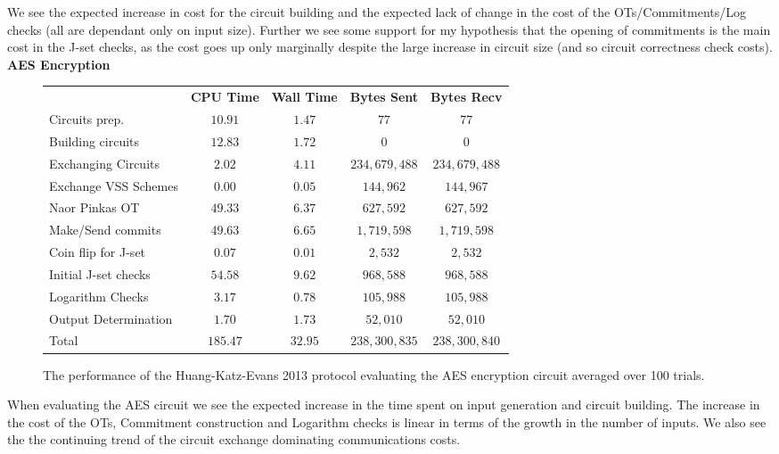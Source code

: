 \documentclass[ %
                    author={Nicholas Tutte},
                supervisor={Prof. Nigel Smart},
                    degree={MEng},
                     title={Secure Two Party Computation},
                  subtitle={A practical comparison of recent protocols},
                      type={Research - GG1K},
                      year={2015} ]{dissertation}
\begin{document}
				We see the expected increase in cost for the circuit building and the expected lack of change in the cost of the OTs/Commitments/Log checks (all are dependant only on input size). Further we see some support for my hypothesis that the opening of commitments is the main cost in the J-set checks, as the cost goes up only marginally despite the large increase in circuit size (and so circuit correctness check costs).\\

				\FloatBarrier
				\noindent \textbf{AES Encryption}
				\begin{figure}[!ht]
					\begin{tabular}{| p{4.3cm} | c c c c |}
						\hline
						& \textbf{CPU Time} & \textbf{Wall Time} & \textbf{Bytes Sent} & \textbf{Bytes Recv} \\
						\thickhline
						Circuits prep. & $10.91$ & $1.47$ & $77$ & $77$ \\
						\hline
						Building circuits & $12.83$ & $1.72$ & $0$ & $0$ \\
						\hline
						Exchanging Circuits & $2.02$ & $4.11$ & $234,679,488$ & $234,679,488$ \\
						\hline
						Exchange VSS Schemes & $0.00$ & $0.05$ & $144,962$ & $144,967$ \\
						\hline
						Naor Pinkas OT & $49.33$ & $6.37$ & $627,592$ & $627,592$ \\
						\hline
						Make/Send commits & $49.63$ & $6.65$ & $1,719,598$ & $1,719,598$ \\
						\hline
						Coin flip for J-set & $0.07$ & $0.01$ & $2,532$ & $2,532$ \\
						\hline
						Initial J-set checks & $54.58$ & $9.62$ & $968,588$ & $968,588$ \\
						\hline
						Logarithm Checks & $3.17$ & $0.78$ & $105,988$ & $105,988$ \\
						\hline
						Output Determination & $1.70$ & $1.73$ & $52,010$ & $52,010$ \\
						\thickhline
						Total & $185.47$ & $32.95$ & $238,300,835$ & $238,300,840$ \\
						\hline
					\end{tabular}
					\caption{The performance of the Huang-Katz-Evans 2013 protocol evaluating the AES encryption circuit averaged over 100 trials.\label{table:HKE_2013_AES}}
				\end{figure}

				When evaluating the AES circuit we see the expected increase in the time spent on input generation and circuit building. The increase in the cost of the OTs, Commitment construction and Logarithm checks is linear in terms of the growth in the number of inputs. We also see the the continuing trend of the circuit exchange dominating communications costs.\\
\end{document}
